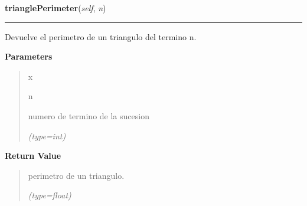 \hspace{.8\funcindent}\begin{boxedminipage}{\funcwidth}

    \raggedright \textbf{trianglePerimeter}(\textit{self}, \textit{n})

    \vspace{-1.5ex}

    \rule{\textwidth}{0.5\fboxrule}
\setlength{\parskip}{2ex}
    Devuelve el perimetro de un triangulo del termino n.

\setlength{\parskip}{1ex}
      \textbf{Parameters}
      \vspace{-1ex}

      \begin{quote}
        \begin{Ventry}{x}

          \item[n]

          numero de termino de la sucesion

            {\it (type=int)}

        \end{Ventry}

      \end{quote}

      \textbf{Return Value}
    \vspace{-1ex}

      \begin{quote}
      perimetro de un triangulo.

      {\it (type=float)}

      \end{quote}

    \end{boxedminipage}

    \label{FractalZE:sierpinsky:Sierpinsky:triangleWidth}

    \vspace{0.5ex}

